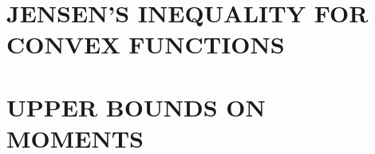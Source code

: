 \documentclass[12pt]{report}
\begin{document}
\chapter{JENSEN'S INEQUALITY FOR CONVEX FUNCTIONS}
\chapter{UPPER BOUNDS ON MOMENTS}

%
%
%


\thebiography

\end{document}
